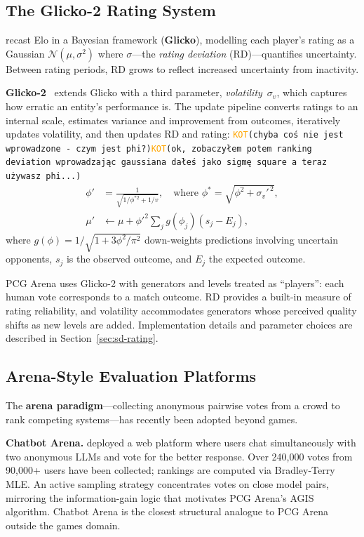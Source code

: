 \documentclass[shortabstract, mgr, english]{iithesis}
\newcommand{\DEBUG}[1]{{#1}} %
\newcommand{\KOT}[1]{\DEBUG{\tt{\textcolor{orange}{KOT}(}{#1}{)}}}
\begin{document}
\subsection{The Glicko-2 Rating System}
\label{subsec:bg-glicko2}

\citet{glickman1999parameter} recast Elo in a Bayesian framework
(\textbf{Glicko}), modelling each player's rating as a Gaussian
$\mathcal{N}(\mu, \sigma^2)$ where $\sigma$---the \emph{rating deviation}
(RD)---quantifies uncertainty. Between rating periods, RD grows to reflect
increased uncertainty from inactivity.

\textbf{Glicko-2}~\citep{glickman2012glicko2} extends Glicko with a third
parameter, \emph{volatility}~$\sigma_v$, which captures how erratic an entity's
performance is. The update pipeline converts ratings to an internal scale,
estimates variance and improvement from outcomes, iteratively updates volatility,
and then updates RD and rating: \KOT{chyba coś nie jest wprowadzone - czym jest phi?}\KOT{ok, zobaczyłem potem ranking deviation wprowadzając gaussiana dałeś jako sigmę square a teraz używasz phi...}
%
\begin{align}
\phi' &= \frac{1}{\sqrt{1/\phi^{*2} + 1/v}}, \quad
  \text{where } \phi^* = \sqrt{\phi^2 + \sigma_v'^{\,2}},
  \label{eq:glicko-rd-bg} \\
\mu' &\leftarrow \mu + \phi'^2 \sum_j g(\phi_j)(s_j - E_j),
  \label{eq:glicko-mu-bg}
\end{align}
%
where $g(\phi) = 1/\sqrt{1 + 3\phi^2/\pi^2}$ down-weights predictions
involving uncertain opponents, $s_j$ is the observed outcome, and $E_j$ the
expected outcome.

PCG Arena uses Glicko-2 with generators and levels treated as ``players'': each
human vote corresponds to a match outcome. RD provides a built-in measure of
rating reliability, and volatility accommodates generators whose perceived
quality shifts as new levels are added. Implementation details and parameter
choices are described in Section~\ref{sec:sd-rating}.

\subsection{Arena-Style Evaluation Platforms}
\label{subsec:bg-arenas}

The \textbf{arena paradigm}---collecting anonymous pairwise votes from a crowd
to rank competing systems---has recently been adopted beyond games.

\textbf{Chatbot Arena.} \citet{chiang2024chatbot} deployed a web platform where
users chat simultaneously with two anonymous LLMs and vote for the better
response. Over 240,000 votes from 90,000+ users have been collected; rankings are
computed via Bradley-Terry MLE. An active sampling strategy concentrates votes on
close model pairs, mirroring the information-gain logic that motivates PCG
Arena's AGIS algorithm. Chatbot Arena is the closest structural analogue to PCG
Arena outside the games domain.
\end{document}
